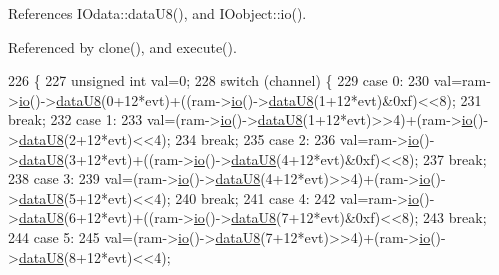 References I\+Odata\+::data\+U8(), and I\+Oobject\+::io().



Referenced by clone(), and execute().


\begin{DoxyCode}
226                                                                                        \{
227   \textcolor{keywordtype}{unsigned} \textcolor{keywordtype}{int} val=0;
228   \textcolor{keywordflow}{switch} (channel) \{
229   \textcolor{keywordflow}{case} 0: 
230     val=ram->\hyperlink{classIOobject_af04fb94137c3d86849f478ac5afab5d1}{io}()->\hyperlink{classIOdata_a75e9c318dbac3a39402179070943d4bc}{dataU8}(0+12*evt)+((ram->\hyperlink{classIOobject_af04fb94137c3d86849f478ac5afab5d1}{io}()->\hyperlink{classIOdata_a75e9c318dbac3a39402179070943d4bc}{dataU8}(1+12*evt)&0xf)<<8);
231     \textcolor{keywordflow}{break}; 
232   \textcolor{keywordflow}{case} 1:
233     val=(ram->\hyperlink{classIOobject_af04fb94137c3d86849f478ac5afab5d1}{io}()->\hyperlink{classIOdata_a75e9c318dbac3a39402179070943d4bc}{dataU8}(1+12*evt)>>4)+(ram->\hyperlink{classIOobject_af04fb94137c3d86849f478ac5afab5d1}{io}()->\hyperlink{classIOdata_a75e9c318dbac3a39402179070943d4bc}{dataU8}(2+12*evt)<<4);
234     \textcolor{keywordflow}{break};
235   \textcolor{keywordflow}{case} 2:
236     val=ram->\hyperlink{classIOobject_af04fb94137c3d86849f478ac5afab5d1}{io}()->\hyperlink{classIOdata_a75e9c318dbac3a39402179070943d4bc}{dataU8}(3+12*evt)+((ram->\hyperlink{classIOobject_af04fb94137c3d86849f478ac5afab5d1}{io}()->\hyperlink{classIOdata_a75e9c318dbac3a39402179070943d4bc}{dataU8}(4+12*evt)&0xf)<<8);
237     \textcolor{keywordflow}{break};
238   \textcolor{keywordflow}{case} 3:
239     val=(ram->\hyperlink{classIOobject_af04fb94137c3d86849f478ac5afab5d1}{io}()->\hyperlink{classIOdata_a75e9c318dbac3a39402179070943d4bc}{dataU8}(4+12*evt)>>4)+(ram->\hyperlink{classIOobject_af04fb94137c3d86849f478ac5afab5d1}{io}()->\hyperlink{classIOdata_a75e9c318dbac3a39402179070943d4bc}{dataU8}(5+12*evt)<<4);
240     \textcolor{keywordflow}{break};
241   \textcolor{keywordflow}{case} 4:
242     val=ram->\hyperlink{classIOobject_af04fb94137c3d86849f478ac5afab5d1}{io}()->\hyperlink{classIOdata_a75e9c318dbac3a39402179070943d4bc}{dataU8}(6+12*evt)+((ram->\hyperlink{classIOobject_af04fb94137c3d86849f478ac5afab5d1}{io}()->\hyperlink{classIOdata_a75e9c318dbac3a39402179070943d4bc}{dataU8}(7+12*evt)&0xf)<<8);
243     \textcolor{keywordflow}{break};
244   \textcolor{keywordflow}{case} 5:
245     val=(ram->\hyperlink{classIOobject_af04fb94137c3d86849f478ac5afab5d1}{io}()->\hyperlink{classIOdata_a75e9c318dbac3a39402179070943d4bc}{dataU8}(7+12*evt)>>4)+(ram->\hyperlink{classIOobject_af04fb94137c3d86849f478ac5afab5d1}{io}()->\hyperlink{classIOdata_a75e9c318dbac3a39402179070943d4bc}{dataU8}(8+12*evt)<<4); 

\end{DoxyCode}
